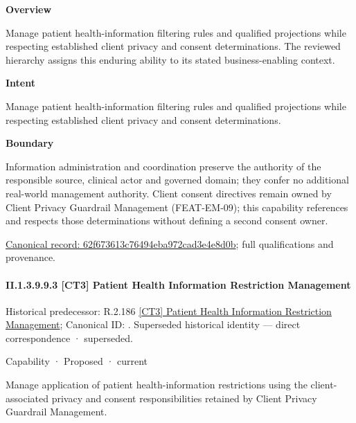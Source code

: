 \textbf{Overview}



Manage patient health-information filtering rules and qualified projections while respecting established client privacy and consent determinations. The reviewed hierarchy assigns this enduring ability to its stated business-enabling context.



\textbf{Intent}



Manage patient health-information filtering rules and qualified projections while respecting established client privacy and consent determinations.



\textbf{Boundary}



Information administration and coordination preserve the authority of the responsible source, clinical actor and governed domain; they confer no additional real-world management authority. Client consent directives remain owned by Client Privacy Guardrail Management (FEAT-EM-09); this capability references and respects those determinations without defining a second consent owner.


{\footnotesize \href{../../../../../../../continuum/strategy/capability/62f673613c76494eba972cad3e4e8d0b.md}{Canonical record: 62f673613c76494eba972cad3e4e8d0b}; full qualifications and provenance.}\par
\paragraph*{II.1.3.9.9.3 [CT3] Patient Health Information Restriction Management}
\label{navigation:II.1.3.9.9.3}

{\small Historical predecessor: R.2.186 \hyperref[element:5ad91d045474435a96b560e66ff7de05]{[CT3] Patient Health Information Restriction Management}; Canonical ID: \texttt{}. Superseded historical identity — direct correspondence · superseded.}\par
\label{element:262366990bda4ac4ace5429269cf6a98}
{\small Capability · Proposed · current}\par

Manage application of patient health-information restrictions using the client-associated privacy and consent responsibilities retained by Client Privacy Guardrail Management.



